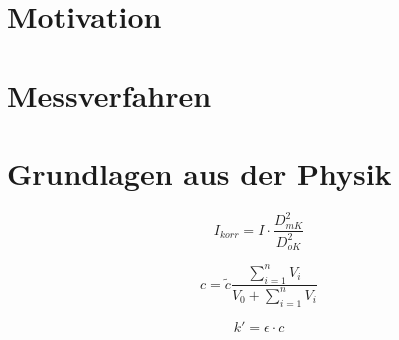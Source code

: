 \section{Motivation}



\section{Messverfahren}



\section{Grundlagen aus der Physik}

\begin{equation}
    I_{korr} = I \cdot \frac{D_{mK}^2}{D_{oK}^2}
    \label{eq:Ikorr}
\end{equation}

\begin{equation}
    c = \tilde{c} \frac{\sum_{i=1}^n V_i}{V_0 + \sum_{i=1}^n V_i}
    \label{eq:Konzentration}
\end{equation}

\begin{equation}
    k' = \epsilon \cdot c
    \label{eq:dekAbsorp}
\end{equation}
